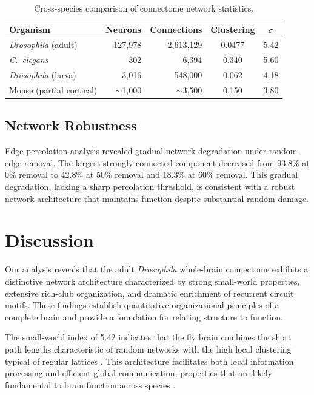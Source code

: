 \documentclass[11pt]{article}
\begin{document}
\begin{table}[ht]
\centering
\caption{Cross-species comparison of connectome network statistics.}
\label{tab:cross}
\begin{tabular}{@{}lrrcc@{}}
\toprule
Organism & Neurons & Connections & Clustering & $\sigma$ \\
\midrule
\textit{Drosophila} (adult) & 127,978 & 2,613,129 & 0.0477 & 5.42 \\
\textit{C.~elegans} & 302 & 6,394 & 0.340 & 5.60 \\
\textit{Drosophila} (larva) & 3,016 & 548,000 & 0.062 & 4.18 \\
Mouse (partial cortical) & $\sim$1,000 & $\sim$3,500 & 0.150 & 3.80 \\
\bottomrule
\end{tabular}
\end{table}

\subsection{Network Robustness}

Edge percolation analysis revealed gradual network degradation under random edge removal. The largest strongly connected component decreased from 93.8\% at 0\% removal to 42.8\% at 50\% removal and 18.3\% at 60\% removal. This gradual degradation, lacking a sharp percolation threshold, is consistent with a robust network architecture that maintains function despite substantial random damage.

\section{Discussion}

Our analysis reveals that the adult \textit{Drosophila} whole-brain connectome exhibits a distinctive network architecture characterized by strong small-world properties, extensive rich-club organization, and dramatic enrichment of recurrent circuit motifs. These findings establish quantitative organizational principles of a complete brain and provide a foundation for relating structure to function.

The small-world index of 5.42 indicates that the fly brain combines the short path lengths characteristic of random networks with the high local clustering typical of regular lattices \citep{watts1998collective, bassett2017network}. This architecture facilitates both local information processing and efficient global communication, properties that are likely fundamental to brain function across species \citep{bullmore2009complex}.
\end{document}
